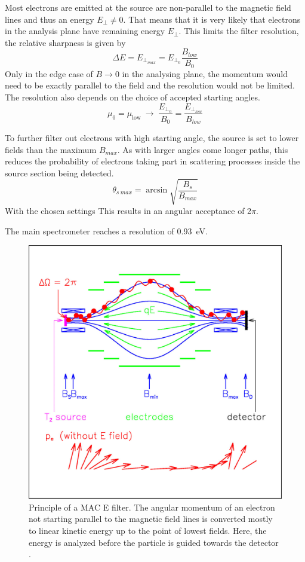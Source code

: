 		Most electrons are emitted at the source are non-parallel to the magnetic field lines and thus an energy $E_\bot \neq 0$. That means that it is very likely that electrons in the analysis plane have remaining energy $E_\bot$. This limits the filter resolution, the relative sharpness is given by
		\begin{equation}
		\Delta E = E_{\bot_{max}} = E_{\bot_0}\frac{B_{low}}{B_{0}}
		\end{equation}
		Only in the edge case of $B\rightarrow 0$ in the analysing plane, the momentum would need to be exactly parallel to the field and the resolution would not be limited. The resolution also depends on the choice of accepted starting angles. 
		\begin{equation}
			\mu_{\mathrm{0}} = \mu_{\mathrm{low}} ~ \longrightarrow ~ \frac{E_{\bot_0}}{B_0} = \frac{E_{\bot_{low}}}{B_{low}} 
		\end{equation}
      
      
      To further filter out electrons with high starting angle, the source is set to lower fields than the maximum $B_{max}$.
      As with larger angles come longer paths, this reduces the probability of electrons taking part in scattering processes inside the source section being detected.
      \begin{equation}
      	\theta_{s~max}= \arcsin{\sqrt{\frac{B_s}{B_{max}}}}
      \end{equation}
      With the chosen settings This results in an angular acceptance of 2$\pi$.
      
      The main spectrometer reaches a resolution of \SI{0.93}{\electronvolt}.
            \begin{figure}
	\centering
      	\includegraphics[width = 0.6 \textwidth]{graphics/katrinExperiment/macEFilter.jpg}
      	\caption[MAC E Filter]{Principle of a MAC E filter. The angular momentum of an electron not starting parallel to the magnetic field lines is converted mostly to linear kinetic energy up to the point of lowest fields. Here, the energy is analyzed before the particle is guided towards the detector \cite{macEFilter}.}
      	\label{fig:katrinExperiment:macEFilter}
      \end{figure}
      

